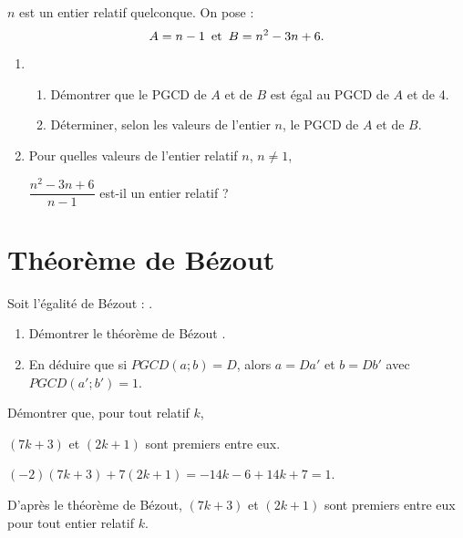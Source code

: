 \documentclass{cornouaille}
\begin{document}
\begin{exercice}
$n$ est un entier relatif quelconque. On pose :
$$A=n-1\enskip \text{et}\enskip B=n^2-3n+6.$$
\begin{enumerate}
\item\begin{enumerate}
\item Démontrer que le PGCD de $A$ et de $B$ est égal au PGCD de $A$ et de 4.
\item Déterminer, selon les valeurs de l'entier $n$, le PGCD de $A$ et de $B$.
\end{enumerate}
\item Pour quelles valeurs de l'entier relatif $n$, $n\neq1$,

$\dfrac{n^2-3n+6}{n-1}$ est-il un entier relatif ?
\end{enumerate}
\end{exercice}


\section{Théorème de Bézout}

\begin{exercice}
Soit l'égalité de Bézout :  \fg .
\begin{enumerate}
\item Démontrer le théorème de Bézout  \fg .
\item En déduire que si $PGCD(a;b) = D$, alors $a = Da'$ et $b = Db'$ avec $PGCD(a'; b') = 1$.
\end{enumerate}
\end{exercice}



\begin{exercice}[]
\label{exo-bezout}
Démontrer que, pour tout relatif $k$,

$(7k+3)$ et $(2k+1)$ sont premiers entre eux.
\end{exercice}
\begin{solution}
  $(-2)(7k+3)+7(2k+1)=-14k-6+14k+7=1$.

  D'après le théorème de Bézout, $(7k+3)$ et $(2k+1)$ sont premiers
  entre eux pour tout entier relatif $k$.
\end{solution}
\end{document}
